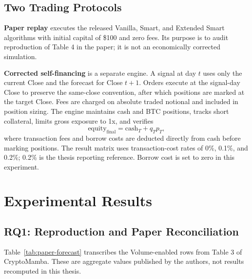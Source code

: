 \documentclass[13pt,a4paper,oneside]{report}
\begin{document}
\section{Two Trading Protocols}\label{sec:trading-method}
\textbf{Paper replay} executes the released Vanilla, Smart, and Extended Smart algorithms with
initial capital of \$100 and zero fees. Its purpose is to audit reproduction of Table 4 in the
paper; it is not an economically corrected simulation.

\textbf{Corrected self-financing} is a separate engine. A signal at day $t$ uses only the current
Close and the forecast for Close $t+1$. Orders execute at the signal-day Close to preserve the
same-close convention, after which positions are marked at the target Close. Fees are charged on
absolute traded notional and included in position sizing. The engine maintains cash and BTC
positions, tracks short collateral, limits gross exposure to 1x, and verifies
\begin{equation}\label{eq:reconcile}
\mathrm{equity}_{\mathrm{final}}=
\mathrm{cash}_{T}+q_Tp_T,
\end{equation}
where transaction fees and borrow costs are deducted directly from cash before marking positions.
The result matrix uses transaction-cost rates of 0\%, 0.1\%, and 0.2\%; 0.2\% is the thesis
reporting reference. Borrow cost is set to zero in this experiment.

\chapter{Experimental Results}\label{chap:results}

\section{RQ1: Reproduction and Paper Reconciliation}\label{sec:rq1-results}
Table~\ref{tab:paper-forecast} transcribes the Volume-enabled rows from Table 3 of CryptoMamba.
These are aggregate values published by the authors, not results recomputed in this thesis.
\end{document}
